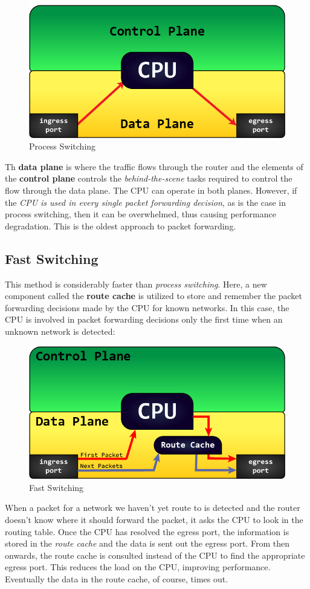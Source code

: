 \begin{figure}[H]
\centering
\includegraphics[width=0.5\linewidth]{"ICND1/2. Routers/chapters/7.4.a Process Switching"}
\caption{Process Switching}
\label{fig:7.4.a}
\end{figure}
\vspace{-10pt}
\noindent
Th \textbf{data plane} is where the traffic flows through the router and the elements of the  \textbf{control plane} controls the \textit{behind-the-scene} tasks required to control the flow through the data plane. The CPU can operate in both planes. However, if the \textit{CPU is used in every single packet forwarding decision}, as is the case in process switching, then it can be overwhelmed, thus causing performance degradation. This is the oldest approach to packet forwarding. 

\subsection{Fast Switching}
This method is considerably faster than \textit{process switching}. Here, a new component called the \textbf{route cache} is utilized to store and remember the packet forwarding decisions made by the CPU for known networks. In this case, the CPU is involved in packet forwarding decisions only the first time when an unknown network is detected:

\begin{figure}[H]
\centering
\includegraphics[width=0.5\linewidth]{"ICND1/2. Routers/chapters/7.4.b Fast Switching"}
\caption{Fast Switching}
\label{fig:7.4.b}
\end{figure}
\vspace{-10pt}
\noindent
When a packet for a network we haven't yet route to is detected and the router doesn't know where it should forward the packet, it asks the CPU to look in the routing table. Once the CPU has resolved the egress port, the information is stored in the \textit{route cache} and the data is sent out the egress port. From then onwards, the route cache is consulted instead of the CPU to find the appropriate egress port. This reduces the load on the CPU, improving performance. Eventually the data in the route cache, of course, times out. 

